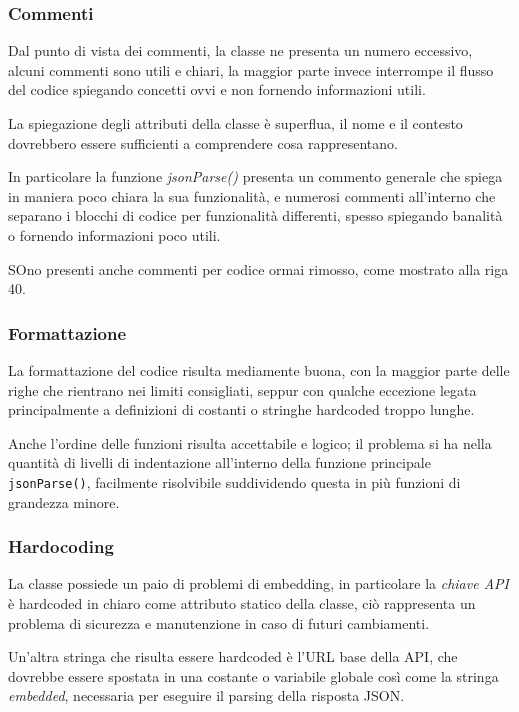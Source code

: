         \subsubsection{Commenti}
        Dal punto di vista dei commenti, la classe ne presenta un numero eccessivo, alcuni commenti sono utili e chiari, la maggior parte invece interrompe il flusso del codice 
        spiegando concetti ovvi e non fornendo informazioni utili.

        La spiegazione degli attributi della classe è superflua, il nome e il contesto dovrebbero essere sufficienti a comprendere cosa rappresentano.

        In particolare la funzione \textit{jsonParse()} presenta un commento generale che spiega in maniera poco chiara la sua funzionalità, e numerosi commenti all'interno che 
        separano i blocchi di codice per funzionalità differenti, spesso spiegando banalità o fornendo informazioni poco utili.

        SOno presenti anche commenti per codice ormai rimosso, come mostrato alla riga 40.

        \subsubsection{Formattazione}
        La formattazione del codice risulta mediamente buona, con la maggior parte delle righe che rientrano nei limiti consigliati, seppur con qualche eccezione legata principalmente a 
        definizioni di costanti o stringhe hardcoded troppo lunghe.

        Anche l'ordine delle funzioni risulta accettabile e logico; il problema si ha nella quantità di livelli di indentazione all'interno della funzione principale \texttt{jsonParse()},
        facilmente risolvibile suddividendo questa in più funzioni di grandezza minore.
        
        \subsubsection{Hardocoding}
        La classe possiede un paio di problemi di embedding, in particolare la \textit{chiave API} è hardcoded in chiaro come attributo statico della classe, 
        ciò rappresenta un problema di sicurezza e manutenzione in caso di futuri cambiamenti.

        Un'altra stringa che risulta essere hardcoded è l'URL base della API, che dovrebbe essere spostata in una costante o variabile globale così come la stringa \textit{\textunderscore embedded}, 
        necessaria per eseguire il parsing della risposta JSON. 

